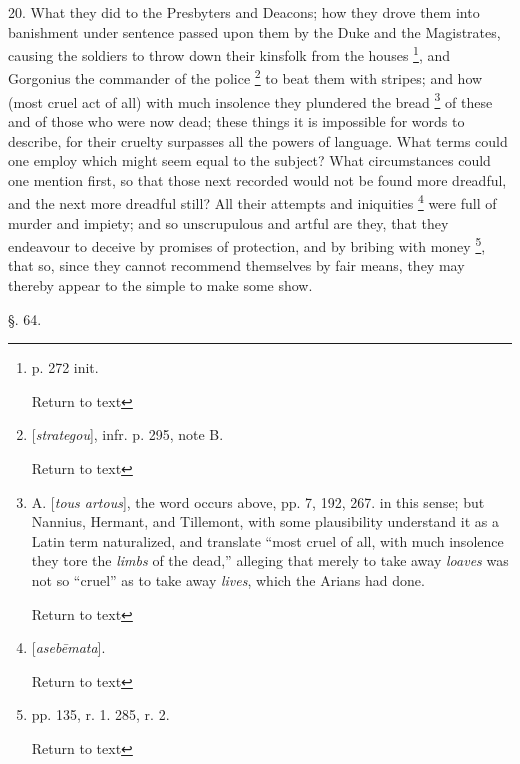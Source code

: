 20. What they did to the Presbyters and Deacons;
how they drove them into banishment under sentence passed upon them by
the Duke and the Magistrates, causing the soldiers to throw down their
kinsfolk from the houses \footnote{p. 272 init.

Return to text}, and Gorgonius the commander of the
police \footnote{[\emph{strategou}], infr. p. 295, note B.

Return to text} to beat them with stripes; and how (most cruel act of
all) with much insolence they plundered the bread \footnote{A. [\emph{tous artous}], the word occurs above,
pp. 7, 192, 267. in this sense; but Nannius, Hermant, and Tillemont,
with some plausibility understand it as a Latin term naturalized, and
translate ``most cruel of all, with much insolence they tore the \emph{limbs}
of the dead,'' alleging that merely to take away \emph{loaves} was
not so ``cruel'' as to take away \emph{lives}, which the Arians had
done.

Return to text

} of these
and of those who were now dead; these things it is impossible for
words to describe, for their cruelty surpasses all the powers of
language. What terms could one employ which might seem equal to the
subject? What circumstances could one mention first, so that those
next recorded would not be found more dreadful, and the next more
dreadful still? All their attempts and iniquities \footnote{[\emph{aseb\={e}mata}].

Return to text} were full
of murder and impiety; and so unscrupulous and artful are they, that
they endeavour to deceive by promises of protection, and by bribing
with money \footnote{pp. 135, r. 1. 285, r. 2.

Return to text}, that so, since they cannot recommend themselves
by fair means, they may thereby appear to the simple to make some
show.


§. 64.

